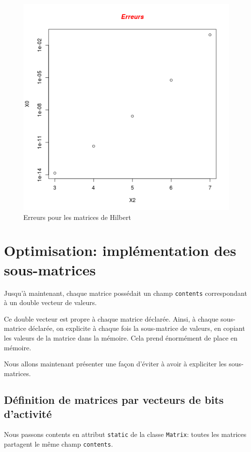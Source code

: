 \documentclass[a4paper,11pt]{article}
\begin{document}
\begin{figure}
  \centering
  \includegraphics[scale=0.5]{Error.png}
  \caption{Erreurs pour les matrices de Hilbert}
  \label{fig:phd}
\end{figure}


\section{Optimisation: implémentation des sous-matrices}


Jusqu'à maintenant, chaque matrice possédait un champ \texttt{contents} correspondant à un double vecteur de valeurs.

Ce double vecteur est propre à chaque matrice déclarée. Ainsi, à chaque sous-matrice déclarée, on explicite à chaque fois la sous-matrice de valeurs, en copiant les valeurs de la matrice dans la mémoire. Cela prend énormément de place en mémoire.

Nous allons maintenant présenter une façon d'éviter à avoir à expliciter les sous-matrices.

\subsection{Définition de matrices par vecteurs de bits d'activité}

Nous passons contents en attribut \texttt{static} de la classe \texttt{Matrix}: toutes les matrices partagent le même champ \texttt{contents}.
\end{document}
